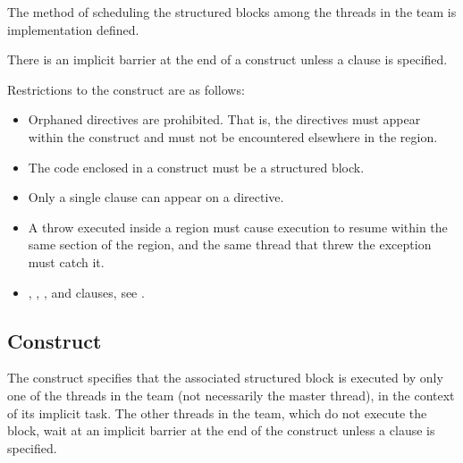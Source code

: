 The method of scheduling the structured blocks among the threads in the team is 
implementation defined.

There is an implicit barrier at the end of a  construct unless a  
clause is specified.

\restrictions
Restrictions to the  construct are as follows:

\begin{itemize}
\item Orphaned  directives are prohibited. That is, the  directives must 
appear within the  construct and must not be encountered elsewhere in the 
 region.

\item The code enclosed in a  construct must be a structured block. 

\item Only a single  clause can appear on a  directive.

\cppspecificstart
\item A throw executed inside a  region must cause execution to resume within 
the same section of the  region, and the same thread that threw the 
exception must catch it.
\cppspecificend
\end{itemize}

\crossreferences
\begin{itemize}
\item {}, , , and  clauses, see 
.
\end{itemize}










\subsection{ Construct}
\label{subsec:single Construct}
\summary
The  construct specifies that the associated structured block is executed by only 
one of the threads in the team (not necessarily the master thread), in the context of its 
implicit task. The other threads in the team, which do not execute the block, wait at an 
implicit barrier at the end of the  construct unless a  clause is specified.

